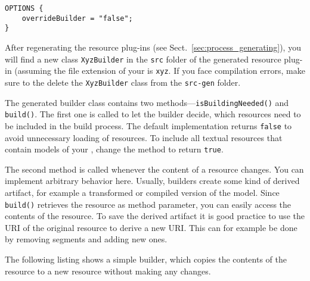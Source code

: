 \begin{lstlisting}
OPTIONS {
    overrideBuilder = "false";
}
\end{lstlisting}

After regenerating the resource plug-ins (see
Sect.~\ref{sec:process_generating}), you will find a new class
\texttt{XyzBuilder} in the \texttt{src} folder of the generated resource 
plug-in (assuming the file extension of your \DSL is \texttt{xyz}. If you
face compilation errors, make sure to the delete the \texttt{XyzBuilder} 
class from the \texttt{src-gen} folder.

The generated builder class contains two methods---\texttt{isBuildingNeeded()} and
\texttt{build()}. The first one is called to let the builder decide, which
resources need to be included in the build process. The default implementation
returns \texttt{false} to avoid unnecessary loading of resources. To include all
textual resources that contain models of your \DSL, change the method to return
\texttt{true}.

The second method is called whenever the content of a resource changes. You can
implement arbitrary behavior here. Usually, builders create some kind of derived
artifact, for example a transformed or compiled version of the \DSL model. Since
\texttt{build()} retrieves the resource as method parameter, you can easily
access the contents of the resource. To save the derived artifact it is good
practice to use the URI of the original resource to derive a new URI. This can
for example be done by removing segments and adding new ones.

The following listing shows a simple builder, which copies the contents of the
resource to a new resource without making any changes.

